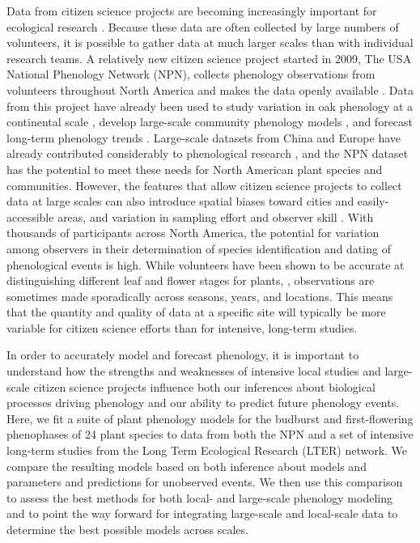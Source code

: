 \documentclass[fleqn,12pt,lineno]{article}
\begin{document}
Data from citizen science projects are becoming increasingly important for ecological research \citep{kelling2009, dickinson2010, tulloch2013}. Because these data are often collected by large numbers of volunteers, it is possible to gather data at much larger scales than with individual research teams. A relatively new citizen science project started in 2009, The USA National Phenology Network (NPN), collects phenology observations from volunteers throughout North America and makes the data openly available \citep{npncitation}. Data from this project have already been used to study variation in oak phenology at a continental scale \citep{gerst2017}, develop large-scale community phenology models \citep{melaas2016}, and forecast long-term phenology trends \citep{jeong2013}. Large-scale datasets from China and Europe have already contributed considerably to phenological research \citep{xu2013, olsson2014, basler2016, zhang2017}, and the NPN dataset has the potential to meet these needs for North American plant species and communities. However, the features that allow citizen science projects to collect data at large scales can also introduce spatial biases toward cities and easily-accessible areas, and variation in sampling effort and observer skill \citep{dickinson2010}. With thousands of participants across North America, the potential for variation among observers in their determination of species identification and dating of phenological events is high. While volunteers have been shown to be accurate at distinguishing different leaf and flower stages for plants, \citep{fuccillo2015}, observations are sometimes made sporadically across seasons, years, and locations. This means that the quantity and quality of data at a specific site will typically be more variable for citizen science efforts than for intensive, long-term studies.

In order to accurately model and forecast phenology, it is important to understand how the strengths and weaknesses of intensive local studies and large-scale citizen science projects influence both our inferences about biological processes driving phenology and our ability to predict future phenology events. Here, we fit a suite of plant phenology models for the budburst and first-flowering phenophases of 24 plant species to data from both the NPN and a set of intensive long-term studies from the Long Term Ecological Research (LTER) network. We compare the resulting models based on both inference about models and parameters and predictions for unobserved events. We then use this comparison to assess the best methods for both local- and large-scale phenology modeling and to point the way forward for integrating large-scale and local-scale data to determine the best possible models across scales.
\end{document}
